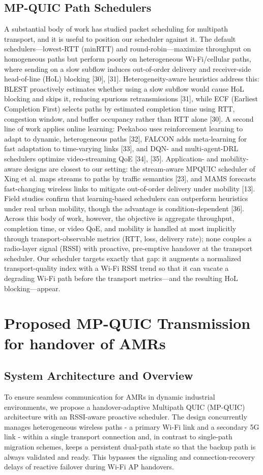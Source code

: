 \documentclass[preprint,11pt]{elsarticle}
\begin{document}
\subsection{MP-QUIC Path Schedulers}
A substantial body of work has studied packet scheduling for multipath transport, and it is useful to position our scheduler against it. The default schedulers---lowest-RTT (minRTT) and round-robin---maximize throughput on homogeneous paths but perform poorly on heterogeneous Wi-Fi/cellular paths, where sending on a slow subflow induces out-of-order delivery and receiver-side head-of-line (HoL) blocking [30], [31]. Heterogeneity-aware heuristics address this: BLEST proactively estimates whether using a slow subflow would cause HoL blocking and skips it, reducing spurious retransmissions [31], while ECF (Earliest Completion First) selects paths by estimated completion time using RTT, congestion window, and buffer occupancy rather than RTT alone [30]. A second line of work applies online learning: Peekaboo uses reinforcement learning to adapt to dynamic, heterogeneous paths [32], FALCON adds meta-learning for fast adaptation to time-varying links [33], and DQN- and multi-agent-DRL schedulers optimize video-streaming QoE [34], [35]. Application- and mobility-aware designs are closest to our setting: the stream-aware MPQUIC scheduler of Xing et al. maps streams to paths by traffic semantics [23], and MAMS forecasts fast-changing wireless links to mitigate out-of-order delivery under mobility [13]. Field studies confirm that learning-based schedulers can outperform heuristics under real urban mobility, though the advantage is condition-dependent [36]. Across this body of work, however, the objective is aggregate throughput, completion time, or video QoE, and mobility is handled at most implicitly through transport-observable metrics (RTT, loss, delivery rate); none couples a radio-layer signal (RSSI) with proactive, pre-emptive handover at the transport scheduler. Our scheduler targets exactly that gap: it augments a normalized transport-quality index with a Wi-Fi RSSI trend so that it can vacate a degrading Wi-Fi path before the transport metrics---and the resulting HoL blocking---appear.
\section{Proposed MP-QUIC Transmission for handover of AMRs}
\subsection{System Architecture and Overview}
To ensure seamless communication for AMRs in dynamic industrial environments, we propose a handover-adaptive Multipath QUIC (MP-QUIC) architecture with an RSSI-aware proactive scheduler. The design concurrently manages heterogeneous wireless paths - a primary Wi-Fi link and a secondary 5G link - within a single transport connection and, in contrast to single-path migration schemes, keeps a persistent dual-path state so that the backup path is always validated and ready. This bypasses the signaling and connection-recovery delays of reactive failover during Wi-Fi AP handovers.
\end{document}
